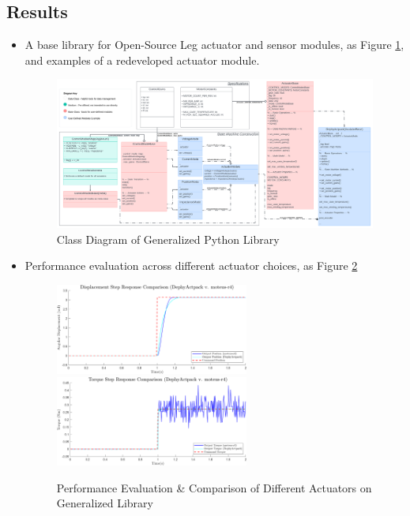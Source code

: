 \documentclass[12pt]{article}
\begin{document}
\subsection{Results}


\begin{itemize}

    \item{A base library for Open-Source Leg actuator and sensor modules, as Figure \ref*{Python Lib Class Diagram}, and examples of a redeveloped actuator module.}
    
    \begin{figure}[H]
        \centering
        \includegraphics[width=1.0\textwidth]{portfolio/Class Diagram Base Lib.png}
        \caption{Class Diagram of Generalized Python Library}
        \label{Python Lib Class Diagram}
    \end{figure}
    \item {Performance evaluation across different actuator choices, as Figure \ref{Dephy-Moteus Comp}}
    
    \begin{figure}[H]
        \centering
        \includegraphics[width=0.6\textwidth]{portfolio/position_comp.png}
        \includegraphics[width=0.6\textwidth]{portfolio/torque_comp.png}
        \caption{Performance Evaluation \& Comparison of Different Actuators on Generalized Library}
        \label{Dephy-Moteus Comp}
    \end{figure}
    

\end{itemize}
\end{document}
